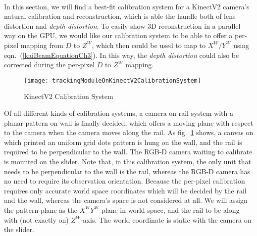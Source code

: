 \\\indent
%
In this section, we will find a best-fit calibration system for a KinectV2 camera's natural calibration and reconstruction, which is able the handle both of lens distortion and \emph{depth distortion}. %
To easily show 3D reconstruction in a parallel way on the GPU, we would like our calibration system to be able to offer a per-pixel mapping from \(D\) to \(Z^W\), which then could be used to map to \(X^W/Y^W\) using eqn.~(\ref{kaiBeamEquationCh3}). In this way, the \emph{depth distortion} could also be corrected during the per-pixel \(D\) to \(Z^W\) mapping.
%
\begin{figure}[t]
\centering
\texttt{[image: trackingModuleOnKinectV2CalibrationSystem]}
\caption{KinectV2 Calibration System}
\label{trackingModuleOnKinectV2CalibrationSystemCh3}
\end{figure}%
%
Of all different kinds of calibration systems, a camera on rail system with a planar pattern on wall is finally decided, which offers a moving plane with respect to the camera when the camera moves along the rail. As fig.~\ref{trackingModuleOnKinectV2CalibrationSystemCh3} shows, a canvas on which printed an uniform grid dots pattern is hung on the wall, and the rail is required to be perpendicular to the wall. The RGB-D camera waiting to calibrate is mounted on the slider. Note that, in this calibration system, the only unit that needs to be perpendicular to the wall is the rail, whereas the RGB-D camera has no need to require its observation orientation. Because the per-pixel calibration requires only accurate world space coordinates which will be decided by the rail and the wall, whereas the camera's space is not considered at all. We will assign the pattern plane as the \(X^WY^W\) plane in world space, and the rail to be along with (not exactly on) \(Z^W\)-axis. The world coordinate is static with the camera on the slider. %
